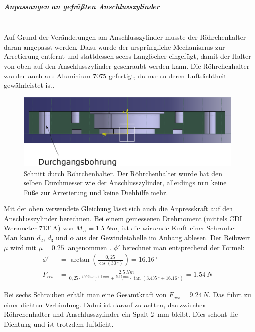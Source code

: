 \subparagraph{Anpassungen an gefräßten Anschlusszylinder}
\hfill \\

Auf Grund der Veränderungen am Anschlusszylinder musste der Röhrchenhalter daran angepasst werden. Dazu  wurde der ursprüngliche Mechanismus zur Arretierung entfernt und stattdessen sechs Langlöcher eingefügt, damit der Halter von oben auf den Anschlusszylinder geschraubt werden kann. Die Röhrchenhalter wurden auch aus Aluminium 7075 gefertigt, da nur so deren Luftdichtheit gewährleistet ist.

\begin{figure}[h!]
	\begin{center}
		\includegraphics[scale=0.5]{Schnitt_RoehrchenhalterV2.png}
		\caption[Röhrchenhalter V2]{Schnitt durch Röhrchenhalter. Der Röhrchenhalter wurde hat den selben Durchmesser wie der Anschlusszylinder, allerdings nun keine Füße zur Arretierung und keine Drehhilfe mehr.}
	\end{center}
\end{figure}

Mit der oben verwendete Gleichung lässt sich auch die Anpresskraft auf den Anschlusszylinder berechnen. Bei einem gemessenen Drehmoment (mittels CDI Werameter 7131A) von $M_A = \SI{1,5}{Nm}$, ist die wirkende Kraft einer Schraube: \\

Man kann $d_2$, $d_3$ und $\alpha$ aus der Gewindetabelle im Anhang ablesen. Der Reibwert $\mu$ wird mit $\mu = \SI{0,25}{}$ angenommen \cite{GDV2011}. $\phi'$ berechnet man entsprechend der Formel:
\begin{align*}
	\phi' &= \arctan\left( \frac{0,25}{\cos(\SI{30}{^\circ})} \right) = \SI{16,16}{^\circ} \\
	F_{res} &= \frac{\SI{2,5}{Nm}}{0,25 \cdot \frac{\SI{4,773}{mm} + \SI{6}{mm}}{4} + \frac{\SI{5,35}{mm}}{2} \cdot \tan(\SI{3,405}{^\circ} + \SI{16,16}{^\circ})} = \SI{1,54}{N}
\end{align*}

Bei sechs Schrauben erhält man eine Gesamtkraft von $F_{ges} = \SI{9,24}{N}$. Das führt zu einer dichten Verbindung. Dabei ist darauf zu achten, das zwischen Röhrchenhalter und Anschlusszylinder ein Spalt \SI{2}{mm} bleibt. Dies schont die Dichtung und ist trotzdem luftdicht.

